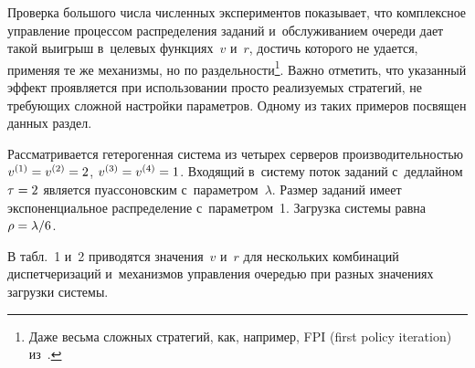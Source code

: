 \begin{multicols}{2}
\vspace*{-6pt}

   Проверка большого числа численных экспериментов показывает, что 
комплексное управление процессом распределения заданий и~обслуживанием 
очереди дает такой выигрыш в~целевых функциях~$v$ и~$r$, достичь которого 
не удается, применяя те же механизмы, но по раздельности\footnote{Даже весьма 
сложных стратегий, как, например, FPI (first policy iteration) из~\cite{4-kon}.}. Важно отметить, что указанный 
эффект проявляется при использовании просто реализуемых стратегий, не 
требующих сложной настройки параметров. Одному из таких примеров 
посвящен данных раздел.
   
   Рассматривается гетерогенная система из четырех серверов 
производительностью $v^{(1)}\hm= v^{(2)}\hm=2$, 
$v^{(3)}\hm= v^{(4)}\hm=1$. Входящий в~систему поток заданий с~дедлайном $\tau\hm=2$ является пуассоновским 
с~параметром~$\lambda$. Размер заданий имеет экспоненциальное 
распределение с~параметром~1. Загрузка системы равна $\rho\hm= \lambda/6$.
   
   В табл.~1 и~2 приводятся значения~$v$ и~$r$ для нескольких комбинаций 
диспетчеризаций и~механизмов управления очередью при разных значениях 
загрузки системы.
   
\begin{table*}\small %
\begin{center}
\parbox{400pt}{
}

\vspace*{2ex}


\end{center}
\end{table*}
\end{multicols}
